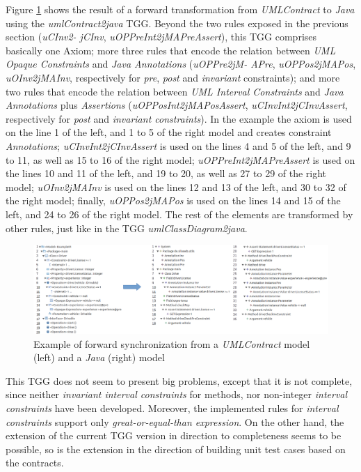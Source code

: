 \documentclass[tuberlin,cic,tc,english,noabntcite]{iiufrgs}
\begin{document}
Figure \ref{fig:umlContracts2java_Example01} shows the result of a forward transformation from \emph{UMLContract} to \emph{Java} using the \emph{umlContract2java} TGG. Beyond the two rules exposed in the previous section (\emph{uCInv2- jCInv}, \emph{uOPPreInt2jMAPreAssert}), this TGG comprises basically one Axiom; more three rules that encode the relation between \emph{UML Opaque Constraints} and \emph{Java Annotations} (\emph{uOPPre2jM- APre},  \emph{uOPPos2jMAPos}, \emph{uOInv2jMAInv}, respectively for \emph{pre}, \emph{post} and \emph{invariant} constraints); and more two rules that encode the relation between \emph{UML Interval Constraints} and \emph{Java Annotations} plus \emph{Assertions} (\emph{uOPPosInt2jMAPosAssert}, \emph{uCInvInt2jCInvAssert}, respectively for \emph{post} and \emph{invariant constraints}). In the example the axiom is used on the line 1 of the left, and 1 to 5 of the right model and creates constraint \emph{Annotations}; \emph{uCInvInt2jCInvAssert} is used on the lines 4 and 5 of the left, and 9 to 11, as well as 15 to 16 of the right model; \emph{uOPPreInt2jMAPreAssert} is used on the lines 10 and 11 of the left, and 19 to 20, as well as 27 to 29 of the right model;  \emph{uOInv2jMAInv} is used on the lines 12 and 13 of the left, and 30 to 32 of the right model; finally, \emph{uOPPos2jMAPos} is used on the lines 14 and 15 of the left, and 24 to 26 of the right model. The rest of the elements are transformed by other rules, just like in the TGG \emph{umlClassDiagram2java}.

\begin{figure}[H]
    \caption{Example of forward synchronization from a \emph{UMLContract} model (left) and a \emph{Java} (right) model}
    \begin{center}
       	\includegraphics[width=\textwidth]{umlContracts2java_Example01}
    \end{center}
    \label{fig:umlContracts2java_Example01}
\end{figure}

This TGG does not seem to present big problems, except that it is not complete, since neither \emph{invariant interval constraints} for methods, nor non-integer \emph{interval constraints} have been developed. Moreover, the implemented rules for \emph{interval constraints} support only \emph{great-or-equal-than expression}. On the other hand, the extension of the current TGG version in direction to completeness seems to be possible, so is the extension in the direction of building unit test cases based on the contracts.
\end{document}
